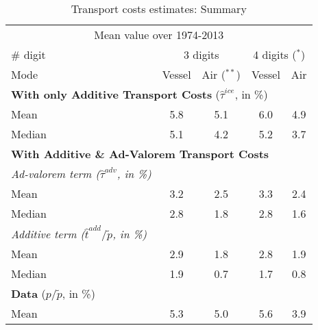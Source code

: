 \documentclass[11pt,twoside, authoryear]{elsarticle}
\begin{document}
\begin{table}[htbp]
  \centering
  \footnotesize{
  \caption{Transport costs estimates: Summary \label{sec_oa:add_only}}
  \begin{center}
    \begin{tabular}{l|cc|cc}
      \hline \hline
    \multicolumn{5}{c}{Mean value over 1974-2013}   \\
    \# digit & \multicolumn{2}{c}{3 digits} & \multicolumn{2}{c}{4 digits ($^\ast$)} \\ \hline
    Mode  & Vessel & Air ($^{\ast \ast}$) & Vessel & Air \\ \hline
    \multicolumn{5}{l}{\textbf{With only Additive Transport Costs} ($\widehat{\tau}^{ice}$, in \%)}  \\ \hline
    Mean  & 5.8 & 5.1 & 6.0 & 4.9 \\
    Median & 5.1 & 4.2 & 5.2 & 3.7 \\ \hline
    \multicolumn{5}{l}{\textbf{With Additive \& Ad-Valorem Transport Costs} } \\ \hline
   \textit{Ad-valorem term ($\widehat{\tau}^{adv}$, in \%)} & & & & \\ \hline
    Mean  & 3.2 & 2.5 & 3.3 & 2.4 \\
    Median & 2.8 & 1.8 & 2.8 & 1.6 \\ \hline
    \textit{Additive term ($\widehat{t}^{add}/\widetilde{p}$, in \%)}& & & &   \\ \hline
    Mean  & 2.9 & 1.8 & 2.8 & 1.9 \\
    Median & 1.9 & 0.7 & 1.7 & 0.8 \\ \hline
    \multicolumn{5}{l}{\textbf{Data} ($p/\widetilde{p}$, in \%) } \\ \hline
        Mean & 5.3 & 5.0& 5.6&3.9 \\

\end{tabular}
\end{center}}
\end{table}
\end{document}
